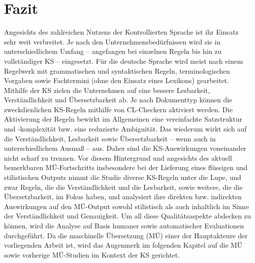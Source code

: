 \section{\label{sec:2.6}Fazit}

Angesichts des zahlreichen Nutzens der Kontrollierten Sprache ist ihr Einsatz sehr weit verbreitet. Je nach den Unternehmensbedürfnissen wird sie in unterschiedlichem Umfang -- angefangen bei einzelnen Regeln bis hin zu vollständiger KS -- eingesetzt. Für die deutsche Sprache wird meist nach einem Regelwerk mit grammatischen und syntaktischen Regeln, terminologischen Vorgaben sowie Fachtermini (ohne den Einsatz eines Lexikons) gearbeitet. Mithilfe der KS zielen die Unternehmen auf eine bessere Lesbarkeit, Verständlichkeit und Übersetzbarkeit ab. Je nach Dokumenttyp können die zweckdienlichen KS-Regeln mithilfe von CL-Checkern aktiviert werden. Die Aktivierung der Regeln bewirkt im Allgemeinen eine vereinfachte Satzstruktur und -komplexität bzw. eine reduzierte Ambiguität. Das wiederum wirkt sich auf die Verständlichkeit, Lesbarkeit sowie Übersetzbarkeit -- wenn auch in unterschiedlichem Ausmaß -- aus. Daher sind die KS-Auswirkungen voneinander nicht scharf zu trennen. Vor diesem Hintergrund und angesichts des aktuell bemerkbaren MÜ-Fortschritts insbesondere bei der Lieferung eines flüssigen und stilistischen Outputs nimmt die Studie diverse KS-Regeln unter die Lupe, und zwar Regeln, die die Verständlichkeit und die Lesbarkeit, sowie weitere, die die Übersetzbarkeit, im Fokus haben, und analysiert ihre direkten bzw. indirekten Auswirkungen auf den MÜ-Output sowohl stilistisch als auch inhaltlich im Sinne der Verständlichkeit und Genauigkeit. Um all diese Qualitätsaspekte abdecken zu können, wird die Analyse auf Basis humaner sowie automatischer Evaluationen durchgeführt. Da die maschinelle Übersetzung (MÜ) einer der Hauptakteure der vorliegenden Arbeit ist, wird das Augenmerk im folgenden Kapitel auf die MÜ sowie vorherige MÜ-Studien im Kontext der KS gerichtet.
